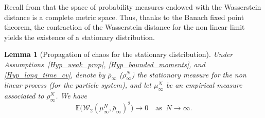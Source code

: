 \documentclass[10pt]{amsart}
\theoremstyle{plain}
\newtheorem{lemma}{Lemma}[section]
\theoremstyle{definition}
\begin{document}
Recall from \cite{bolley_separability} that the space of probability measures endowed with the Wasserstein distance is a complete metric space. Thus, thanks to the Banach fixed point theorem, the contraction of the Wasserstein distance for the non linear limit yields the existence of a stationary distribution.

\begin{lemma}[Propagation of chaos for the stationary distribution]
Under Assumptions~\ref{Hyp_weak_prop}, \ref{Hyp_bounded_moments}, and \ref{Hyp_long_time_cv}, denote by $\bar{\rho}_{\infty}$ (\resp $\rho^N_{\infty}$) the stationary measure for the non linear process (\resp for the particle system), and let $\mu^N_{\infty}$ be an empirical measure associated to $\rho^N_{\infty}$. We have
\[
\mathbb{E}\bigl(\mathcal{W}_2\left(\mu^N_{\infty},\bar{\rho}_{\infty}\right)^2\bigr)\to 0\quad\text{as }\ N\to\infty.
\]
\end{lemma}
\end{document}
